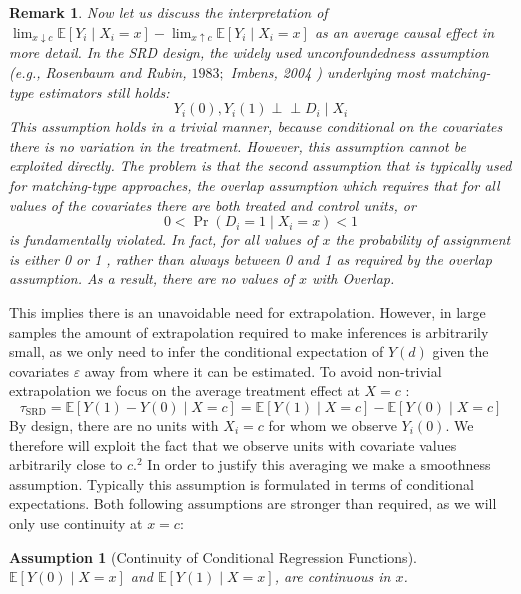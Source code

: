 \documentclass[11pt]{book}%
\newtheorem{remark}{Remark}
\newtheorem{assu}{Assumption}
\begin{document}
\begin{remark}
	Now let us discuss the interpretation of $\lim _{x \downarrow c} \mathbb{E}\left[Y_{i} \mid X_{i}=x\right]-\lim _{x \uparrow c} \mathbb{E}\left[Y_{i} \mid X_{i}=x\right]$ as an average causal effect
	in more detail. In the SRD design, the widely used unconfoundedness assumption (e.g., Rosenbaum and Rubin, $1983 ;$ Imbens, 2004 ) underlying most matching-type estimators still holds:
	$$
	Y_{i}(0), Y_{i}(1) \perp \!\!\! \perp D_{i} \mid X_{i}
	$$
	This assumption holds in a trivial manner, because conditional on the covariates there is no variation in the treatment. However, this assumption cannot be exploited directly. The problem is that the second assumption that is typically used for matching-type approaches, the overlap assumption which requires that for all values of the covariates there are both treated and control units, or
	$$
	0<\operatorname{Pr}\left(D_{i}=1 \mid X_{i}=x\right)<1
	$$
	is fundamentally violated. In fact, for all values of $x$ the probability of assignment is either 0 or 1 , rather than always between 0 and 1 as required by the overlap assumption. As a result, there are no values of $x$ with Overlap.
\end{remark}

This implies there is an unavoidable need for extrapolation. However, in large samples the amount of extrapolation required to make inferences is arbitrarily small, as we only need to infer the conditional expectation of $Y(d)$ given the covariates $\varepsilon$ away from where it can be estimated. To avoid non-trivial extrapolation we focus on the average treatment effect at $X=c$ :
$$
\tau_{\mathrm{SRD}}=\mathbb{E}[Y(1)-Y(0) \mid X=c]=\mathbb{E}[Y(1) \mid X=c]-\mathbb{E}[Y(0) \mid X=c]
$$
By design, there are no units with $X_{i}=c$ for whom we observe $Y_{i}(0)$. We therefore will exploit the fact that we observe units with covariate values arbitrarily close to $c .^{2}$ In order to justify this averaging we make a smoothness assumption. Typically this assumption is formulated in terms of conditional expectations. Both following assumptions are stronger than required, as we will only use continuity at $x=c$: 
\begin{assu}[Continuity of Conditional Regression Functions] 
	~\\
	$\mathbb{E}[Y(0) \mid X=x]$ and $\mathbb{E}[Y(1) \mid X=x]$,
	are continuous in $x$.
\end{assu}
\end{document}
